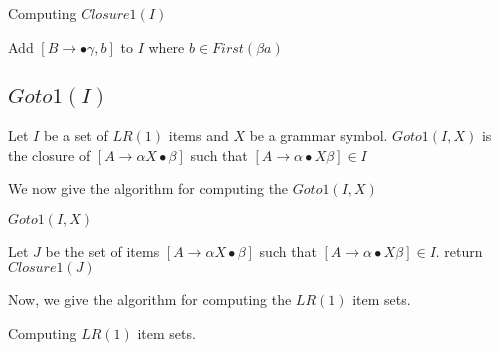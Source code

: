 \documentclass[•]{book}
\begin{document}
\begin{algorithm}
\caption{Computing $Closure1(I)$}
\begin{algorithmic}
\REPEAT
{}
\STATE Add $[B \rightarrow \bullet \gamma, b]$ to $I$ where $b \in First(\beta a)$
\ENDIF
{}
\end{algorithmic}
\end{algorithm}

\subsection{$Goto1(I)$}
Let $I$ be a set of $LR(1)$ items and $X$ be a grammar symbol. $Goto1(I,X)$ is the closure of $[A \rightarrow \alpha X \bullet \beta]$ such that $[A \rightarrow \alpha\bullet X  \beta] \in I$

We now give the algorithm for computing the $Goto1(I,X)$

\begin{algorithm}
\caption{$Goto1(I,X)$}
\begin{algorithmic}
\STATE Let $J$ be the set of items $[A \rightarrow \alpha X \bullet \beta]$ such that $[A \rightarrow \alpha\bullet X  \beta] \in I$.
\STATE return $Closure1(J)$
\end{algorithmic}
\end{algorithm}

Now, we give the algorithm for computing the $LR(1)$ item sets.

\begin{algorithm}
\caption{Computing $LR(1)$ item sets.}
\begin{algorithmic}
\end{algorithmic}
\end{algorithm}  	

 
\end{document}
